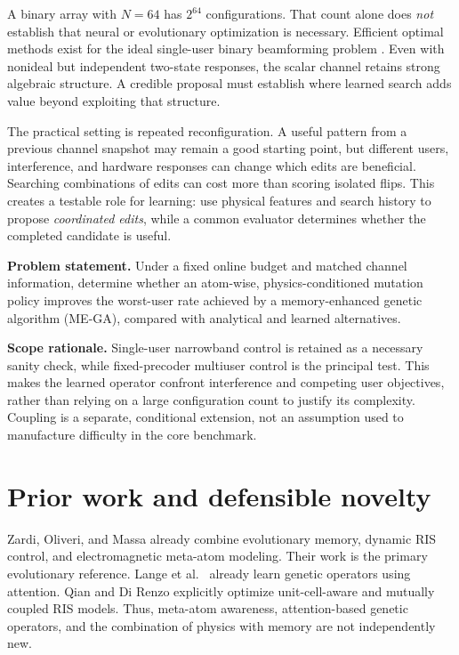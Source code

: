 \documentclass[conference]{IEEEtran}
\begin{document}
A binary array with $N=64$ has $2^{64}$ configurations. That count alone does \emph{not} establish that neural or evolutionary optimization is necessary. Efficient optimal methods exist for the ideal single-user binary beamforming problem \cite{zhang}. Even with nonideal but independent two-state responses, the scalar channel retains strong algebraic structure. A credible proposal must establish where learned search adds value beyond exploiting that structure.

The practical setting is repeated reconfiguration. A useful pattern from a previous channel snapshot may remain a good starting point, but different users, interference, and hardware responses can change which edits are beneficial. Searching combinations of edits can cost more than scoring isolated flips. This creates a testable role for learning: use physical features and search history to propose \emph{coordinated edits}, while a common evaluator determines whether the completed candidate is useful.

\textbf{Problem statement.} Under a fixed online budget and matched channel information, determine whether an atom-wise, physics-conditioned mutation policy improves the worst-user rate achieved by a memory-enhanced genetic algorithm (ME-GA), compared with analytical and learned alternatives.

\textbf{Scope rationale.} Single-user narrowband control is retained as a necessary sanity check, while fixed-precoder multiuser control is the principal test. This makes the learned operator confront interference and competing user objectives, rather than relying on a large configuration count to justify its complexity. Coupling is a separate, conditional extension, not an assumption used to manufacture difficulty in the core benchmark.

\section{Prior work and defensible novelty}
Zardi, Oliveri, and Massa \cite{zardi} already combine evolutionary memory, dynamic RIS control, and electromagnetic meta-atom modeling. Their work is the primary evolutionary reference. Lange et al.\ \cite{lange} already learn genetic operators using attention. Qian and Di Renzo \cite{qian} explicitly optimize unit-cell-aware and mutually coupled RIS models. Thus, meta-atom awareness, attention-based genetic operators, and the combination of physics with memory are not independently new.
\end{document}
